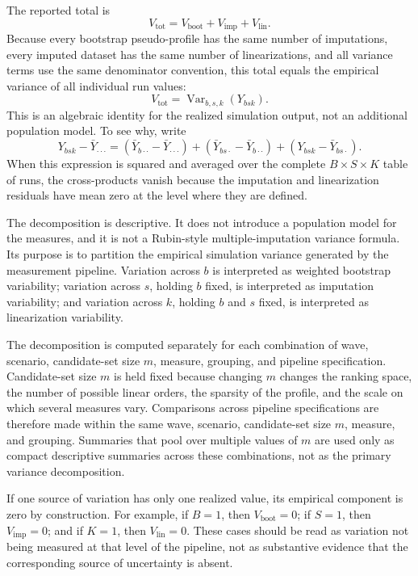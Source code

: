\documentclass[12pt]{article}
\begin{document}
The reported total is
\[
V_{\mathrm{tot}}
=
V_{\mathrm{boot}}+V_{\mathrm{imp}}+V_{\mathrm{lin}}.
\]
Because every bootstrap pseudo-profile has the same number of imputations, every
imputed dataset has the same number of linearizations, and all variance terms
use the same denominator convention, this total equals the empirical variance
of all individual run values:
\[
V_{\mathrm{tot}}
=
\operatorname{Var}_{b,s,k}(Y_{bsk}).
\]
This is an algebraic identity for the realized simulation output, not an
additional population model. To see why, write
\[
Y_{bsk}-\bar Y_{\cdot\cdot\cdot}
=
\left(\bar Y_{b\cdot\cdot}-\bar Y_{\cdot\cdot\cdot}\right)
+
\left(\bar Y_{bs\cdot}-\bar Y_{b\cdot\cdot}\right)
+
\left(Y_{bsk}-\bar Y_{bs\cdot}\right).
\]
When this expression is squared and averaged over the complete
\(B\times S\times K\) table of runs, the cross-products vanish because the
imputation and linearization residuals have mean zero at the level where they
are defined.

The decomposition is descriptive. It does not introduce a population model for
the measures, and it is not a Rubin-style multiple-imputation variance formula.
Its purpose is to partition the empirical simulation variance generated by the
measurement pipeline. Variation across \(b\) is interpreted as weighted
bootstrap variability; variation across \(s\), holding \(b\) fixed, is
interpreted as imputation variability; and variation across \(k\), holding
\(b\) and \(s\) fixed, is interpreted as linearization variability.

The decomposition is computed separately for each combination of wave, scenario,
candidate-set size \(m\), measure, grouping, and pipeline specification.
Candidate-set size \(m\) is held fixed because changing \(m\) changes the
ranking space, the number of possible linear orders, the sparsity of the
profile, and the scale on which several measures vary. Comparisons across
pipeline specifications are therefore made within the same wave, scenario,
candidate-set size \(m\), measure, and grouping. Summaries that pool over
multiple values of \(m\) are used only as compact descriptive summaries across
these combinations, not as the primary variance decomposition.

If one source of variation has only one realized value, its empirical component
is zero by construction. For example, if \(B=1\), then
\(V_{\mathrm{boot}}=0\); if \(S=1\), then \(V_{\mathrm{imp}}=0\); and if
\(K=1\), then \(V_{\mathrm{lin}}=0\). These cases should be read as variation
not being measured at that level of the pipeline, not as substantive evidence
that the corresponding source of uncertainty is absent.
\end{document}
